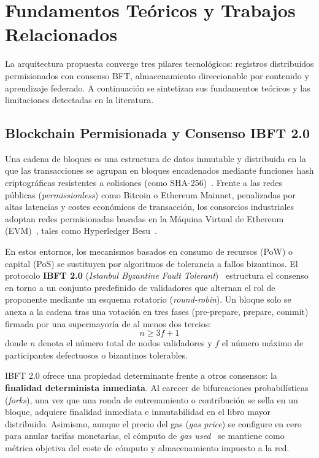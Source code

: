 \section{Fundamentos Teóricos y Trabajos Relacionados}
\label{sec:estado_arte}

La arquitectura propuesta converge tres pilares tecnológicos: registros distribuidos permisionados con consenso BFT, almacenamiento direccionable por contenido y aprendizaje federado. A continuación se sintetizan sus fundamentos teóricos y las limitaciones detectadas en la literatura.

\subsection{Blockchain Permisionada y Consenso IBFT 2.0}
Una cadena de bloques es una estructura de datos inmutable y distribuida en la que las transacciones se agrupan en bloques encadenados mediante funciones hash criptográficas resistentes a colisiones (como SHA-256)~\cite{nist2015sha, zheng2018blockchain}. Frente a las redes públicas (\textit{permissionless}) como Bitcoin o Ethereum Mainnet, penalizadas por altas latencias y costes económicos de transacción, los consorcios industriales adoptan redes permisionadas basadas en la Máquina Virtual de Ethereum (EVM)~\cite{buterin2014ethereum}, tales como Hyperledger Besu~\cite{besu_docs}.

En estos entornos, los mecanismos basados en consumo de recursos (PoW) o capital (PoS) se sustituyen por algoritmos de tolerancia a fallos bizantinos. El protocolo \textbf{IBFT 2.0} (\textit{Istanbul Byzantine Fault Tolerant})~\cite{moniz2020istanbul} estructura el consenso en torno a un conjunto predefinido de validadores que alternan el rol de proponente mediante un esquema rotatorio (\textit{round-robin}). Un bloque solo se anexa a la cadena tras una votación en tres fases (pre-prepare, prepare, commit) firmada por una supermayoría de al menos dos tercios:
\begin{equation}
n \ge 3f + 1
\end{equation}
donde $n$ denota el número total de nodos validadores y $f$ el número máximo de participantes defectuosos o bizantinos tolerables. 

IBFT 2.0 ofrece una propiedad determinante frente a otros consensos: la \textbf{finalidad determinista inmediata}. Al carecer de bifurcaciones probabilísticas (\textit{forks}), una vez que una ronda de entrenamiento o contribución se sella en un bloque, adquiere finalidad inmediata e inmutabilidad en el libro mayor distribuido. Asimismo, aunque el precio del gas (\textit{gas price}) se configure en cero para anular tarifas monetarias, el cómputo de \textit{gas used}~\cite{ethereum_gas} se mantiene como métrica objetiva del coste de cómputo y almacenamiento impuesto a la red.

